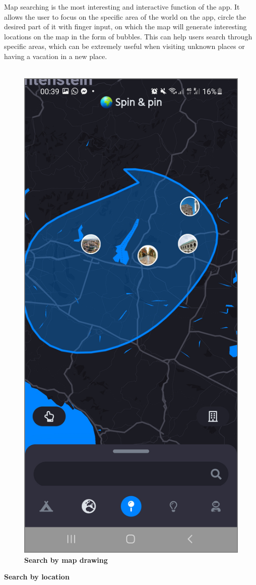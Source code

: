 Map searching is the most interesting and interactive function of the app. It allows the user to focus on the specific area of the world on the app, circle the desired part of it with finger input, on which the map will generate interesting locations on the map in the form of bubbles. This can help users search through specific areas, which can be extremely useful when visiting unknown places or having a vacation in a new place.\\ \\
\begin{figure}[!htb]
\centering
\includegraphics[width=.45\textwidth]{../Images/UI/MapSearchRealDark.jpg}
\caption{\label{fig:dbapiuser}\textbf{Search by map drawing}}
\end{figure}
\newpage

\textbf{Search by location}

